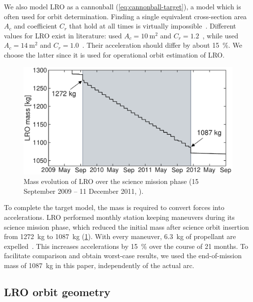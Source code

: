 We also model \gls{LRO} as a cannonball (\cref{eq:cannonball-target}), a model which is often used for orbit determination. Finding a single equivalent cross-section area $A_c$ and coefficient $C_r$ that hold at all times is virtually impossible~\cite{Vallado2013}. Different values for \gls{LRO} exist in literature: \citeauthor{Bauer2016} used $A_c = \qty{10}{\m\squared}$ and $C_r = 1.2$~\cite{Bauer2016}, while \citeauthor{Nicholson2010} used $A_c=\qty{14}{\m\squared}$ and $C_r = 1.0$~\cite{Nicholson2010}. Their acceleration should differ by about \qty{15}{\percent}. We choose the latter since it is used for operational orbit estimation of \gls{LRO}.

\begin{figure}[t]
    \centering
    \includegraphics[width=\linewidth]{figures/plots/mass_history.pdf}
    \caption{Mass evolution of \gls{LRO} over the science mission phase (15 September 2009 -- 11 December 2011, \textcolor[RGB]{206, 211, 217}{}). }
    \label{fig:mass-history}
\end{figure}

To complete the target model, the mass is required to convert forces into accelerations. \gls{LRO} performed monthly station keeping maneuvers during its science mission phase, which reduced the initial mass after science orbit insertion from \qty{1272}{kg} to \qty{1087}{kg} (\cref{fig:mass-history}). With every maneuver, \qty{6.3}{kg} of propellant are expelled~\cite{Mesarch2010}. This increases accelerations by \qty{15}{\percent} over the course of 21 months. To facilitate comparison and obtain worst-case results, we used the end-of-mission mass of \qty{1087}{kg} in this paper, independently of the actual arc.





\subsection{LRO orbit geometry}

